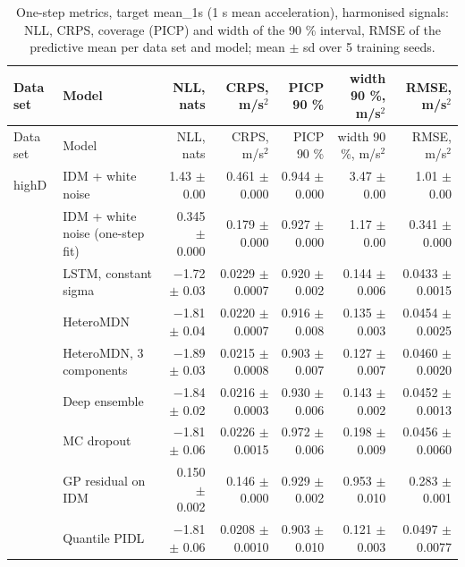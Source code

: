 \begingroup
\footnotesize
\begin{longtable}{llrrrrr}
\caption{One-step metrics, target mean\_1s (1 s mean acceleration), harmonised signals: NLL, CRPS, coverage (PICP) and width of the 90 \% interval, RMSE of the predictive mean per data set and model; mean $\pm$ sd over 5 training seeds.}\label{tab:t1-one-step--harmonised--mean-1s} \\
\toprule
Data set & Model & NLL, nats & CRPS, m/s$^2$ & PICP 90 \% & width 90 \%, m/s$^2$ & RMSE, m/s$^2$ \\
\midrule
\endfirsthead
\toprule
Data set & Model & NLL, nats & CRPS, m/s$^2$ & PICP 90 \% & width 90 \%, m/s$^2$ & RMSE, m/s$^2$ \\
\midrule
\endhead
\bottomrule
\endlastfoot
highD & IDM + white noise & 1.43 $\pm$ 0.00 & 0.461 $\pm$ 0.000 & 0.944 $\pm$ 0.000 & 3.47 $\pm$ 0.00 & 1.01 $\pm$ 0.00 \\
 & IDM + white noise (one-step fit) & 0.345 $\pm$ 0.000 & 0.179 $\pm$ 0.000 & 0.927 $\pm$ 0.000 & 1.17 $\pm$ 0.00 & 0.341 $\pm$ 0.000 \\
 & LSTM, constant sigma & $-$1.72 $\pm$ 0.03 & 0.0229 $\pm$ 0.0007 & 0.920 $\pm$ 0.002 & 0.144 $\pm$ 0.006 & 0.0433 $\pm$ 0.0015 \\
 & HeteroMDN & $-$1.81 $\pm$ 0.04 & 0.0220 $\pm$ 0.0007 & 0.916 $\pm$ 0.008 & 0.135 $\pm$ 0.003 & 0.0454 $\pm$ 0.0025 \\
 & HeteroMDN, 3 components & $-$1.89 $\pm$ 0.03 & 0.0215 $\pm$ 0.0008 & 0.903 $\pm$ 0.007 & 0.127 $\pm$ 0.007 & 0.0460 $\pm$ 0.0020 \\
 & Deep ensemble & $-$1.84 $\pm$ 0.02 & 0.0216 $\pm$ 0.0003 & 0.930 $\pm$ 0.006 & 0.143 $\pm$ 0.002 & 0.0452 $\pm$ 0.0013 \\
 & MC dropout & $-$1.81 $\pm$ 0.06 & 0.0226 $\pm$ 0.0015 & 0.972 $\pm$ 0.006 & 0.198 $\pm$ 0.009 & 0.0456 $\pm$ 0.0060 \\
 & GP residual on IDM & 0.150 $\pm$ 0.002 & 0.146 $\pm$ 0.000 & 0.929 $\pm$ 0.002 & 0.953 $\pm$ 0.010 & 0.283 $\pm$ 0.001 \\
 & Quantile PIDL & $-$1.81 $\pm$ 0.06 & 0.0208 $\pm$ 0.0010 & 0.903 $\pm$ 0.010 & 0.121 $\pm$ 0.003 & 0.0497 $\pm$ 0.0077 \\

\end{longtable}
